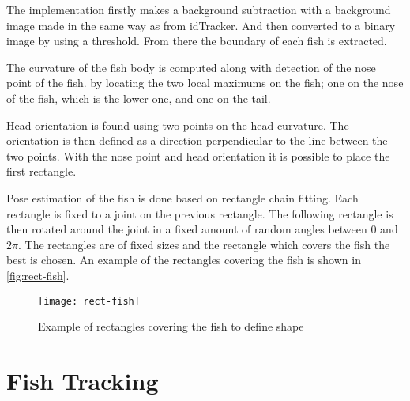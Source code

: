 The implementation firstly makes a background subtraction with a background image made in the same way as from idTracker. And then converted to a binary image by using a threshold. From there the boundary of each fish is extracted.

The curvature of the fish body is computed along with detection of the nose point of the fish. by locating the two local maximums on the fish; one on the nose of the fish, which is the lower one, and one on the tail.

Head orientation is found using two points on the head curvature. The orientation is then defined as a direction perpendicular to the line between the two points. With the nose point and head orientation it is possible to place the first rectangle.

Pose estimation of the fish is done based on rectangle chain fitting. Each rectangle is fixed to a joint on the previous rectangle. The following rectangle is then rotated around the joint in a fixed amount of random angles between $0$ and $2\pi$. The rectangles are of fixed sizes and the rectangle which covers the fish the best is chosen. An example of the rectangles covering the fish is shown in \autoref{fig:rect-fish}.

\begin{figure}[h]
  \centering
  \texttt{[image: rect-fish]}
  \caption{Example of rectangles covering the fish to define shape}
  \label{fig:rect-fish}
\end{figure}

\section{Fish Tracking}
